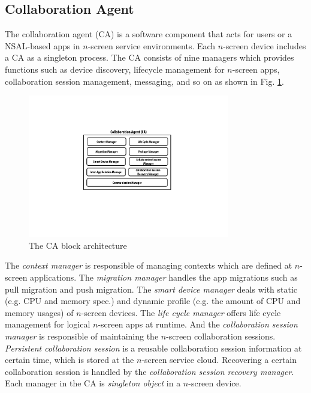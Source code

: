 \documentclass[conference]{IEEEtran}
\begin{document}
\subsection{Collaboration Agent}
\label{subsc:ca}
The collaboration agent (CA) is a software component that acts for users or a NSAL-based apps in $n$-screen service environments.  
Each $n$-screen device includes a CA as a singleton process.
The CA consists of nine managers which provides functions such as device discovery, lifecycle management for $n$-screen apps, collaboration session management, messaging, and so on as shown in Fig. \ref{fig:collaborationagent}. 
\begin{figure}[htb] 
\centering
\includegraphics[width=8.8cm,keepaspectratio]{collaborationagent}
\caption{The CA block architecture}
\label{fig:collaborationagent}
\end{figure}
The \textit{context manager} is responsible of managing contexts which are defined at $n$-screen applications. The \textit{migration manager} handles the app migrations such as pull migration and push migration. 
The \textit{smart device manager} deals with static (e.g. CPU and memory spec.) and dynamic profile (e.g. the amount of CPU and memory usages) of $n$-screen devices.
The \textit{life cycle manager} offers life cycle management for logical $n$-screen apps at runtime.
And the \textit{collaboration session manager} is responsible of maintaining the $n$-screen collaboration sessions.
\textit{Persistent collaboration session} is a reusable collaboration session information at certain time, which is stored at the $n$-screen service cloud.
Recovering a certain collaboration session is handled by the \textit{collaboration session recovery manager}.
Each manager in the CA is \textit{singleton object} in a $n$-screen device.
\end{document}
